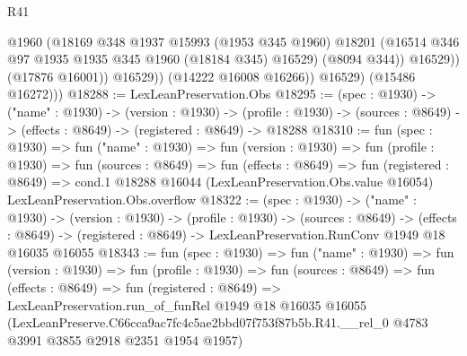 \begin{lexlean}{R41}
\begin{coremodule}
                      @1960
                      (@18169
                        @348
                        @1937
                        @15993
                        (@1953 @345 @1960)
                        @18201
                        (@16514 @346 @97 @1935 @1935 @345 @1960 (@18184 @345) @16529)
                        (@8094 @344))
                      @16529))
                  (@17876 @16001))
                @16529))
            (@14222 @16008 @16266))
          @16529)
        (@15486 @16272)))
@18288 := LexLeanPreservation.Obs
@18295 := (spec : @1930) ->
  ("name" : @1930) ->
  (version : @1930) ->
  (profile : @1930) -> (sources : @8649) -> (effects : @8649) -> (registered : @8649) -> @18288
@18310 := fun (spec : @1930) =>
  fun ("name" : @1930) =>
  fun (version : @1930) =>
  fun (profile : @1930) =>
  fun (sources : @8649) =>
  fun (effects : @8649) =>
  fun (registered : @8649) =>
  cond.{1} @18288 @16044 (LexLeanPreservation.Obs.value @16054) LexLeanPreservation.Obs.overflow
@18322 := (spec : @1930) ->
  ("name" : @1930) ->
  (version : @1930) ->
  (profile : @1930) ->
  (sources : @8649) ->
  (effects : @8649) -> (registered : @8649) -> LexLeanPreservation.RunConv @1949 @18 @16035 @16055
@18343 := fun (spec : @1930) =>
  fun ("name" : @1930) =>
  fun (version : @1930) =>
  fun (profile : @1930) =>
  fun (sources : @8649) =>
  fun (effects : @8649) =>
  fun (registered : @8649) =>
  LexLeanPreservation.run_of_funRel
    @1949
    @18
    @16035
    @16055
    (LexLeanPreserve.C66cca9ac7fc4c5ae2bbd07f753f87b5b.R41.__rel_0
      @4783
      @3991
      @3855
      @2918
      @2351
      @1954
      @1957)
\end{coremodule}
\end{lexlean}
